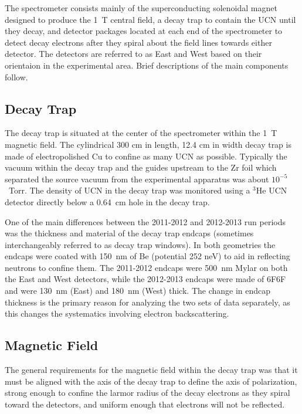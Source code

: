 The spectrometer consists mainly of the superconducting solenoidal magnet designed to produce
the 1~T central field, a decay trap to contain the UCN until they decay, and detector
packages located at each end of the spectrometer to detect decay electrons after they spiral
about the field lines towards either detector. The detectors are referred to as
East and West based on their orientaion in the experimental area.
Brief descriptions of the main components follow.

\subsection{Decay Trap}
The decay trap is situated at the center of the spectrometer within the 1~T magnetic
field. The cylindrical 300 cm in length, 12.4 cm in width decay trap is made of electropolished Cu
to confine as many UCN as possible. Typically the vacuum within the decay trap and the guides
upstream to the Zr foil which separated the source vacuum from the experimental apparatus was about
$10^{-5}$~Torr. The density of UCN in the decay trap was monitored using a $^3\mathrm{He}$ UCN detector
directly below a 0.64~cm hole in the decay trap.

One of the main differences between the 2011-2012 and 2012-2013 run periods was the thickness and
material of the decay trap endcaps (sometimes interchangeably referred to as decay trap windows).
In both geometries the endcaps were coated with 150~nm of
Be (potential 252 neV) to aid in reflecting neutrons to confine them. The 2011-2012 endcaps
were 500~nm Mylar on both the East and West detectors, while the 2012-2013 endcaps were made of 6F6F
\cite{hoedl2003} and were 130~nm (East) and 180~nm (West) thick. The change in endcap thickness
is the primary reason for analyzing the two sets of data separately, as this changes the
systematics involving electron backscattering. 

\subsection{Magnetic Field} \label{ssec:MagneticField}

The general requirements for the magnetic field within the decay trap was that it must be aligned with
the axis of the decay trap to define the axis of polarization, strong enough to confine the larmor
radius of the decay electrons as they spiral toward the detectors, and uniform enough that
electrons will not be reflected.

